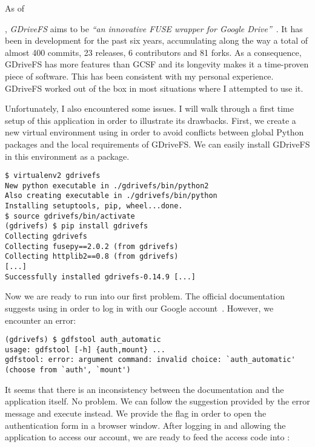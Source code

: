 As of \date{June 2018}, \emph{GDriveFS} aims to be \emph{``an innovative FUSE wrapper for Google Drive''}~\cite{dsoprea/GDriveFS}. It has been in development for the past six years, accumulating along the way a total of almost 400 commits, 23 releases, 6 contributors and 81 forks. As a consequence, GDriveFS has more features than GCSF and its longevity makes it a time-proven piece of software. This has been consistent with my personal experience. GDriveFS worked out of the box in most situations where I attempted to use it.

Unfortunately, I also encountered some issues. I will walk through a first time setup of this application in order to illustrate its drawbacks. First, we create a new virtual environment using  in order to avoid conflicts between global Python packages and the local requirements of GDriveFS. We can easily install GDriveFS in this environment as a  package.

\begin{lstlisting}[basicstyle=\footnotesize\ttfamily,frame=single,caption=Creating a virtual environment and installing GDriveFS]
$ virtualenv2 gdrivefs
New python executable in ./gdrivefs/bin/python2
Also creating executable in ./gdrivefs/bin/python
Installing setuptools, pip, wheel...done.
$ source gdrivefs/bin/activate
(gdrivefs) $ pip install gdrivefs
Collecting gdrivefs
Collecting fusepy==2.0.2 (from gdrivefs)
Collecting httplib2==0.8 (from gdrivefs)
[...]
Successfully installed gdrivefs-0.14.9 [...]
\end{lstlisting}

Now we are ready to run into our first problem. The official documentation suggests using  in order to log in with our Google account~\cite{GDriveFS_README}. However, we encounter an error:

\begin{lstlisting}[basicstyle=\footnotesize\ttfamily,frame=single,caption=GDriveFS nonexistent authentication command]
(gdrivefs) $ gdfstool auth_automatic
usage: gdfstool [-h] {auth,mount} ...
gdfstool: error: argument command: invalid choice: `auth_automatic' (choose from `auth', `mount')
\end{lstlisting}

It seems that there is an inconsistency between the documentation and the application itself. No problem. We can follow the suggestion provided by the error message and execute  instead. We provide the  flag in order to open the authentication form in a browser window. After logging in and allowing the application to access our account, we are ready to feed the access code into :

